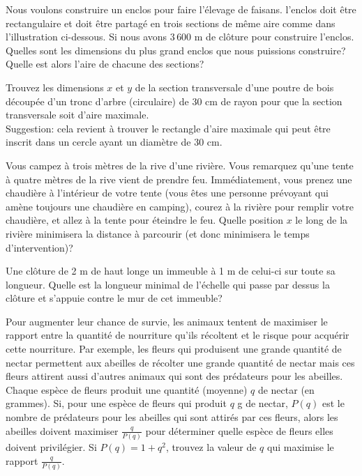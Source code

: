 \begin{question}
Nous voulons construire un enclos pour faire l'élevage de faisans.
l'enclos doit être rectangulaire et doit être partagé en trois
sections de même aire comme dans l'illustration ci-dessous.  Si nous avons
$3\,600$ m de clôture pour construire l'enclos.  Quelles sont les
dimensions du plus grand enclos que nous puissions construire?  Quelle est
alors l'aire de chacune des sections?

\label{6Q32}
\end{question}

\begin{question}
Trouvez les dimensions $x$ et $y$ de la section transversale d'une
poutre de bois découpée d'un tronc d'arbre (circulaire) de $30$ cm de
rayon pour que la section transversale soit d'aire maximale.\\
Suggestion: cela revient à trouver le rectangle d'aire maximale qui
peut être inscrit dans un cercle ayant un diamètre de $30$ cm.
\label{6Q33}
\end{question}

\begin{question}
Vous campez à trois mètres de la rive d'une rivière.  Vous remarquez
qu'une tente à quatre mètres de la rive vient de
prendre feu.  Immédiatement, vous prenez une chaudière à l'intérieur
de votre tente (vous êtes une personne prévoyant qui amène toujours
une chaudière en camping), courez à la rivière pour remplir votre
chaudière, et allez à la tente pour éteindre le feu.  Quelle position
$x$ le long de la rivière minimisera la distance à parcourir (et donc
minimisera le temps d'intervention)?
\label{6Q34}
\end{question}

\begin{question}
Une clôture de 2 m de haut longe un immeuble à 1 m de celui-ci sur
toute sa longueur.  Quelle est la longueur minimal de l'échelle qui
passe par dessus la clôture et s'appuie contre le mur de
cet immeuble?
\label{6Q35}
\end{question}

\begin{question}[\life]
Pour augmenter leur chance de survie, les animaux tentent de maximiser
le rapport entre la quantité de nourriture qu'ils récoltent et le
risque pour acquérir cette nourriture.  Par exemple, les fleurs qui
produisent une grande quantité de nectar permettent aux abeilles de
récolter une grande quantité de nectar mais ces fleurs attirent aussi
d'autres animaux qui sont des prédateurs pour les abeilles.  Chaque
espèce de fleurs produit une quantité (moyenne) $q$ de nectar (en
grammes).  Si, pour une espèce de fleurs qui produit $q$ g de nectar,
$P(q)$ est le nombre de prédateurs pour les abeilles qui sont attirés
par ces fleurs, alors les abeilles doivent maximiser
$\displaystyle \frac{q}{P(q)}$ pour déterminer quelle espèce de fleurs
elles doivent privilégier.  Si $P(q) = 1 + q^2$, trouvez la valeur de $q$
qui maximise le rapport $\displaystyle \frac{q}{P(q)}$.
\label{6Q36}
\end{question}


